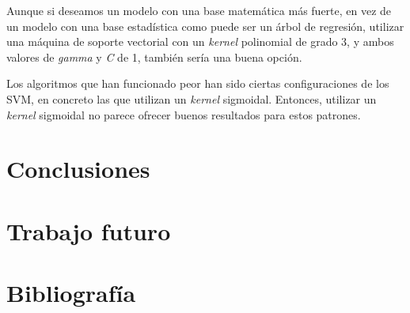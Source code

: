 \documentclass[12pt]{article}
\begin{document}
\bigskip
Aunque si deseamos un modelo con una base matemática más fuerte, en vez de un modelo con una base estadística como puede ser un árbol de regresión,
utilizar una máquina de soporte vectorial con un \textit{kernel} polinomial de grado 3, y ambos valores de \textit{gamma} y \textit{C} de 1, también sería una buena opción. 

Los algoritmos que han funcionado peor han sido ciertas configuraciones de los SVM, en concreto las que utilizan un \textit{kernel} sigmoidal.
Entonces, utilizar un \textit{kernel} sigmoidal no parece ofrecer buenos resultados para estos patrones.

\section{Conclusiones}
\label{Conclusiones}
\section{Trabajo futuro}
\label{Trabajo futuro}

\section{Bibliografía}
\label{Bibliografía}
\printbibliography
\end{document}
